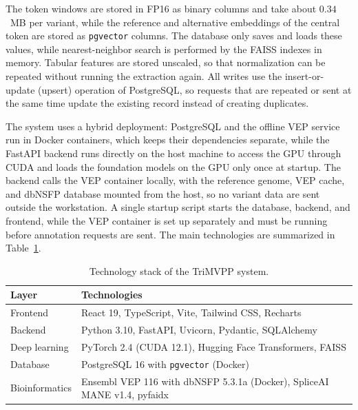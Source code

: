 The token windows are stored in FP16 as binary columns and take about $0.34$~MB per variant, while the reference and alternative embeddings of the central token are stored as \texttt{pgvector} columns. The database only saves and loads these values, while nearest-neighbor search is performed by the FAISS indexes in memory. Tabular features are stored unscaled, so that normalization can be repeated without running the extraction again. All writes use the insert-or-update (upsert) operation of PostgreSQL, so requests that are repeated or sent at the same time update the existing record instead of creating duplicates.

The system uses a hybrid deployment: PostgreSQL and the offline VEP service run in Docker containers, which keeps their dependencies separate, while the FastAPI backend runs directly on the host machine to access the GPU through CUDA and loads the foundation models on the GPU only once at startup. The backend calls the VEP container locally, with the reference genome, VEP cache, and dbNSFP database mounted from the host, so no variant data are sent outside the workstation. A single startup script starts the database, backend, and frontend, while the VEP container is set up separately and must be running before annotation requests are sent. The main technologies are summarized in Table~\ref{tab:tech_stack}.

\begin{table}[htbp]
    \centering
    \caption{Technology stack of the TriMVPP system.}
    \label{tab:tech_stack}
    \begin{tabular}{ll}
        \toprule
        \textbf{Layer} & \textbf{Technologies} \\
        \midrule
        Frontend & React 19, TypeScript, Vite, Tailwind CSS, Recharts \\
        Backend & Python 3.10, FastAPI, Uvicorn, Pydantic, SQLAlchemy \\
        Deep learning & PyTorch 2.4 (CUDA 12.1), Hugging Face Transformers, FAISS \\
        Database & PostgreSQL 16 with \texttt{pgvector} (Docker) \\
        Bioinformatics & Ensembl VEP 116 with dbNSFP 5.3.1a (Docker), SpliceAI MANE v1.4, pyfaidx \\
        \bottomrule
    \end{tabular}
\end{table}

